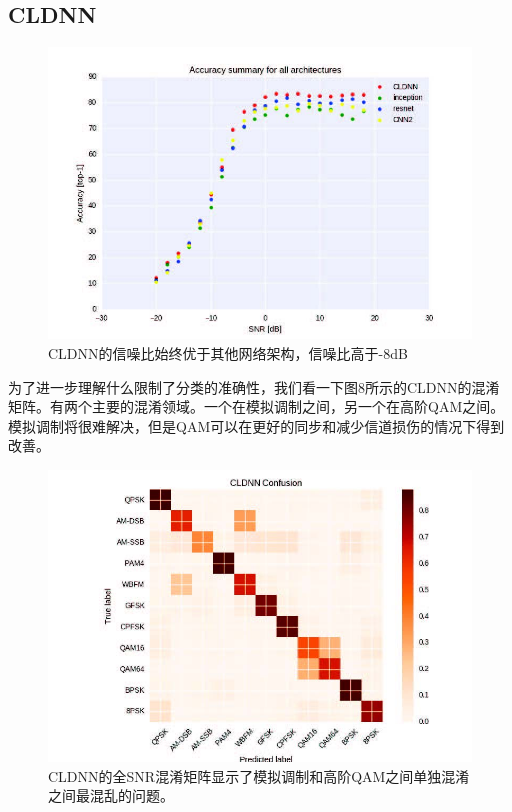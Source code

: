 \subsection{CLDNN}


\begin{figure}[!h]
	\centering
	\includegraphics[scale=1]{figures/chapter_5/fig7}
	\caption{CLDNN的信噪比始终优于其他网络架构，信噪比高于-8dB}
\end{figure}

为了进一步理解什么限制了分类的准确性，我们看一下图8所示的CLDNN的混淆矩阵。有两个主要的混淆领域。一个在模拟调制之间，另一个在高阶QAM之间。模拟调制将很难解决，但是QAM可以在更好的同步和减少信道损伤的情况下得到改善。\par

\begin{figure}[!h]
	\centering
	\includegraphics[scale=1]{figures/chapter_5/fig8}
	\caption{CLDNN的全SNR混淆矩阵显示了模拟调制和高阶QAM之间单独混淆之间最混乱的问题。}
\end{figure}

